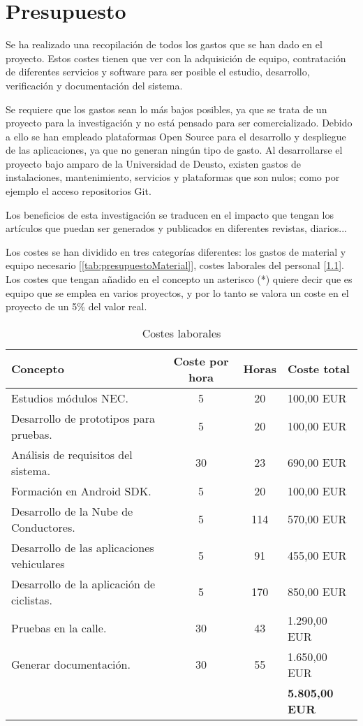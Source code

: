 \chapter{Presupuesto}
Se ha realizado una recopilación de todos los gastos que se han dado en el
proyecto. Estos costes tienen que ver con la adquisición de equipo, contratación
de diferentes servicios y software para ser posible el estudio, desarrollo,
verificación y documentación del sistema.

Se requiere que los gastos sean lo más bajos posibles, ya que se trata de un
proyecto para la investigación y no está pensado para ser comercializado. Debido
a ello se han empleado plataformas Open Source para el desarrollo y despliegue
de las aplicaciones, ya que no generan ningún tipo de gasto. Al desarrollarse el
proyecto bajo amparo de la Universidad de Deusto, existen gastos de
instalaciones, mantenimiento, servicios y plataformas que son nulos; como por
ejemplo el acceso repositorios Git.

Los beneficios de esta investigación se traducen en el impacto que tengan los
artículos que puedan ser generados y publicados en diferentes revistas,
diarios...

Los costes se han dividido en tres categorías diferentes: los gastos de material
y equipo necesario [\ref{tab:presupuestoMaterial}], costes laborales del
personal [\ref{tab:presupuestoLaboral}]. Los costes que tengan añadido en el
concepto un asterisco (*) quiere decir que es equipo que se emplea en varios
proyectos, y por lo tanto se valora un coste en el proyecto de un 5\% del valor
real.

\begin{table}[h]
	\centering
	\caption{Costes laborales}\label{tab:presupuestoLaboral}
	\begin{tabular}{lccl}
		\toprule
		\textbf{Concepto} & \textbf{Coste por hora} & \textbf{Horas} &
			\textbf{Coste total} \\
		\midrule
		Estudios módulos NEC. & 5 & 20 & 100,00 EUR \\
		Desarrollo de prototipos para pruebas. & 5 & 20 & 100,00 EUR \\
		Análisis de requisitos del sistema. & 30 & 23 & 690,00 EUR \\
		Formación en Android SDK. & 5 & 20 & 100,00 EUR \\
		Desarrollo de la Nube de Conductores. & 5 & 114 & 570,00 EUR \\
		Desarrollo de las aplicaciones vehiculares  & 5 & 91 & 455,00 EUR \\
		Desarrollo de la aplicación de ciclistas. & 5 & 170 & 850,00 EUR \\
		Pruebas en la calle. & 30 & 43 & 1.290,00 EUR \\
		Generar documentación. & 30 & 55 & 1.650,00 EUR \\
		& & & \textbf{5.805,00 EUR} \\
		\bottomrule
	\end{tabular}
\end{table}

